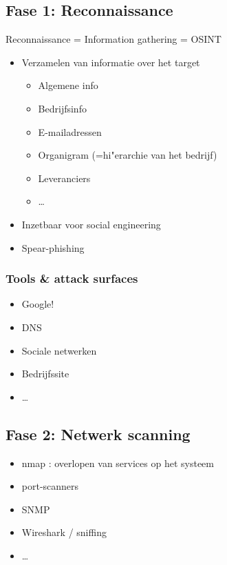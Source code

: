\documentclass{article}
\begin{document}
\subsection{Fase 1: Reconnaissance}

Reconnaissance = Information gathering = OSINT

\begin{itemize}
    \item Verzamelen van informatie over het target
    \begin{itemize}
        \item Algemene info
        \item Bedrijfsinfo
        \item E-mailadressen
        \item Organigram (=hi"erarchie van het bedrijf)
        \item Leveranciers
        \item \dots
    \end{itemize}
    \item Inzetbaar voor social engineering
    \item Spear-phishing
\end{itemize}

\subsubsection{Tools \& attack surfaces}

\begin{itemize}
    \item Google!
    \item DNS
    \item Sociale netwerken
    \item Bedrijfssite
    \item \dots
\end{itemize}

\subsection{Fase 2: Netwerk scanning}

\begin{itemize}
    \item nmap : overlopen van services op het systeem
    \item port-scanners
    \item SNMP
    \item Wireshark / sniffing
    \item \dots
\end{itemize}
\end{document}
